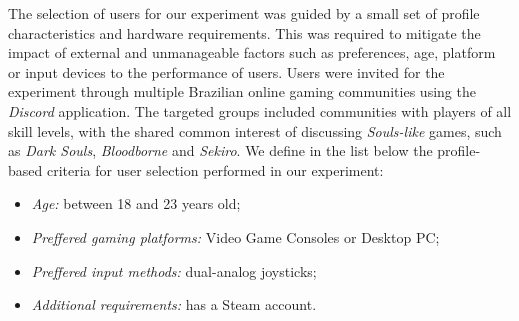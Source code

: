 The selection of users for our experiment was guided by a small set of profile characteristics and hardware requirements. This was required to mitigate the impact of external and unmanageable factors such as preferences, age, platform or input devices to the performance of users. Users were invited for the experiment through multiple Brazilian online gaming communities using the \emph{Discord} application. The targeted groups included communities with players of all skill levels, with the shared common interest of discussing  \emph{Souls-like} games, such as \emph{Dark Souls}, \emph{Bloodborne} and \emph{Sekiro}. We define in the list below the profile-based criteria for user selection performed in our experiment:
\begin{itemize}
    \item{\emph{Age:} between 18 and 23 years old;}
    \item{\emph{Preffered gaming platforms:} Video Game Consoles or Desktop PC;}
    \item{\emph{Preffered input methods:} dual-analog joysticks;}
    \item{\emph{Additional requirements:} has a Steam account.}
\end{itemize}

